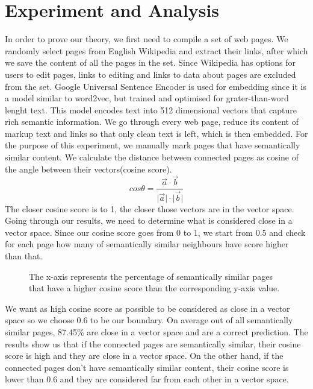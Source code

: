 \documentclass{article}
\newcommand{\norm}[1]{\lvert #1 \rvert}
\newcommand\boxplotbignum{1000000}
\begin{document}
\section{Experiment and Analysis}

In order to prove our theory, we first need to compile a set of web pages. We randomly select pages from English Wikipedia and extract their links, after which we save the content of all the pages in the set. Since Wikipedia has options for users to edit pages, links to editing and links to data about pages are excluded from the set. Google Universal Sentence Encoder \cite{USE} is used for embedding since it is a model similar to word2vec, but trained and optimised for grater-than-word lenght text. This model encodes text into 512 dimensional vectors that capture rich semantic information. We go through every web page, reduce its content of markup text and links so that only clean text is left, which is then embedded.\newline
For the purpose of this experiment, we manually mark pages that have semantically similar content. We calculate the distance between connected pages as cosine of the angle between their vectors(cosine score). \[cos\theta = \frac{\vec{a} \cdot \vec{b}}{\norm{\vec{a}}\cdot\norm{\vec{b}}} \]The closer cosine score is to 1, the closer those vectors are in the vector space.\newline
Going through our results, we need to determine what is considered close in a vector space. Since our cosine score goes from 0 to 1, we start from 0.5 and check for each page how many of semantically similar neighbours have score higher than that. 
\begin{figure}[H]
  \caption{The x-axis represents the percentage of semantically similar pages that have a higher cosine score than the corresponding y-axis value.}
\end{figure}

We want as high cosine score as possible to be considered as close in a vector space so we choose 0.6 to be our boundary. On average out of all semantically similar pages, 87.45\% are close in a vector space and are a correct prediction. 
The results show us that if the connected pages are semantically similar, their cosine score is high and they are close in a vector space. On the other hand, if the connected pages don't have semantically similar content, their cosine score is lower than 0.6 and they are considered far from each other in a vector space. \newline
\end{document}
